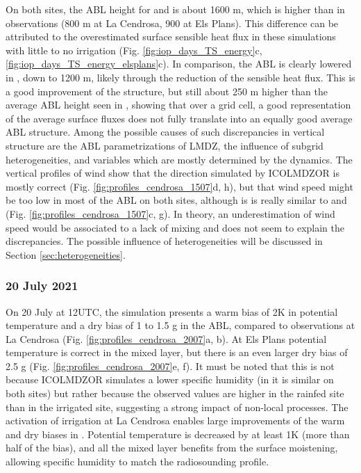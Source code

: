 On both sites, the ABL height for \noirr and \irr is about 1600 m, which is higher than in observations (800 m at La Cendrosa, 900 at Els Plans). This difference can be attributed to the overestimated surface sensible heat flux in these simulations with little to no irrigation (Fig. \ref{fig:iop_days_TS_energy}c,  \ref{fig:iop_days_TS_energy_elsplans}c). 
In comparison, the ABL is clearly lowered in \irrboost, down to 1200 m, likely through the reduction of the sensible heat flux. This is a good improvement of the structure, but still about 250 m higher than the average ABL height seen in \mesomean, showing that over a grid cell, a good representation of the average surface fluxes does not fully translate into an equally good average ABL structure.
Among the possible causes of such discrepancies in vertical structure are the ABL parametrizations of LMDZ, the influence of subgrid heterogeneities, and variables which are mostly determined by the dynamics. The vertical profiles of wind show that the direction simulated by ICOLMDZOR is mostly correct (Fig. \ref{fig:profiles_cendrosa_1507}d, h), but that wind speed might be too low in most of the ABL on both sites, although is is really similar to \mesomean and \mesoexact (Fig. \ref{fig:profiles_cendrosa_1507}c, g). In theory, an underestimation of wind speed would be associated to a lack of mixing and does not seem to explain the discrepancies. The possible influence of heterogeneities will be discussed in Section \ref{sec:heterogeneities}.

\subsubsection*{20 July 2021}

On 20 July at 12UTC, the \noirr simulation presents a warm bias of 2K in potential temperature and a dry bias of 1 to 1.5 g \perkg in the ABL, compared to observations at La Cendrosa (Fig. \ref{fig:profiles_cendrosa_2007}a, b). 
At Els Plans potential temperature is correct in the mixed layer, but there is an even larger dry bias of 2.5 g \perkg (Fig. \ref{fig:profiles_cendrosa_2007}e, f). It must be noted that this is not because ICOLMDZOR simulates a lower specific humidity (in \noirr it is similar on both sites) but rather because the observed values are higher in the rainfed site than in the irrigated site, suggesting a strong impact of non-local processes.
The activation of irrigation at La Cendrosa enables large improvements of the warm and dry biases in \irrboost. Potential temperature is decreased by at least 1K (more than half of the bias), and all the mixed layer benefits from the surface moistening, allowing specific humidity to match the radiosounding profile. 

